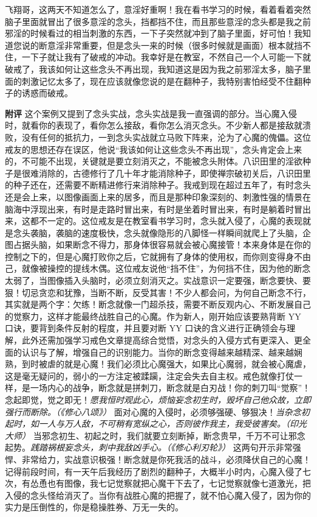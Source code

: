 \begin{case}
    飞翔哥，这两天不知道怎么了，意淫好重啊！我在看书学习的时候，看着看着突然脑子里面就冒出了很多意淫的念头，挡都挡不住，而且那些意淫的念头都是我之前邪淫的时候看过的相当刺激的东西，一下子突然就冲到了脑子里面，好可怕！我知道您说的断意淫非常重要，但是念头一来的时候（很多时候就是画面）根本就挡不住，一下子就让我有了破戒的冲动。我幸好是在教室，不然自己一个人可能一下就破戒了，我该如何让这些念头不再出现，我知道这是因为我之前邪淫太多，脑子里面的刺激记忆太多了，现在应该就像您说的是在翻种子，我特别害怕经受不住翻种子的诱惑而破戒。

    \textbf{附评} 这个案例又提到了念头实战，念头实战是我一直强调的部分。当心魔入侵时，就看你的表现了，看你怎么接敌，看你怎么消灭念头。不少新人都是接敌就溃败，没有任何的抵抗力，一到念头实战就立马败下阵来，沦为了心魔的傀儡。这位戒友的思想还存在误区，他说“我该如何让这些念头不再出现”，念头肯定会上来的，不可能不出现，关键就是要立刻消灭之，不能被念头附体。八识田里的淫欲种子是很难消除的，古德修行了几十年才能消除种子，即使禅宗破初关后，八识田里的种子还在，还需要不断精进修行来消除种子。我戒到现在超过五年了，有时念头还是会上来，以图像画面上来的居多，而且是那种印象深刻的、刺激性强的情景在脑海中浮现出来，有时是走路时冒出来，有时是坐着时冒出来，有时是躺着时冒出来，这都不一定的。这位戒友是在教室看书学习时，念头就入侵了，心魔的表现就是念头袭脑，袭脑的速度极快，念头就像隐形的八脚怪一样瞬间就爬上了头脑，企图占据头脑，如果断念不得力，那身体很容易就会被心魔接管！本来身体是在你的控制之下的，但是心魔打败你之后，它就拥有了身体的使用权，而你则变得身不由己，就像被操控的提线木偶。这位戒友说他“挡不住”，为何挡不住，因为他的断念太弱了，当图像插入头脑时，必须立刻消灭之。实战意识一定要强，断念要快、要狠！切忌贪恋和犹豫，当断不断，反受其害！不少人都会问，为何自己断念不行，其实就是两个字：欠练！断念就像一门超杀技，需要不断反观内心、不断发展自己的觉察力，这样才能最终战胜自己的心魔。作为新人，刚开始应该要熟背断 YY 口诀，要背到条件反射的程度，并且要对断 YY 口诀的含义进行正确领会与理解，此外还需加强学习戒色文章提高综合觉悟，对念头的入侵方式有更深入、更全面的认识与了解，增强自己的识别能力。当你的断念变得越来越精深、越来越娴熟，到时被虐的就是心魔！我们必须比心魔强大，如果比心魔弱，就会被心魔虐，这是毫无疑问的，弱小的一方注定被蹂躏，注定会失去自主权。戒色就像打仗一样，是一场内心的战争，断念就是拼刺刀，断念就是白刃战！你的刺刀叫“觉察”！念起即觉，觉之即无！\textit{愿我恒时观此心，烦恼妄念初生时，毁坏自己他众故，立即强行而断除。（《修心八颂》）} 面对心魔的入侵时，必须够强硬、够狠决！\textit{当杂念初起时，如一人与万人敌，不可稍有宽纵之心，否则彼作我主，我受彼害矣。（印光大师）} 当邪念初生、初起之时，我们就要立刻断掉，断念贵早，千万不可让邪念起势。\textit{践踏祸根妄念头，刺中我敌凶手心。（《修心利刃轮》）} 这两句开示非常强悍、非常给力，实战意识极强！断念就是你死我活的战斗，必须降伏自己的心魔！记得前段时间，有一天午后我经历了剧烈的翻种子，大概半小时内，心魔入侵了七次，有怂恿也有图像，我七记觉察就把心魔干下去了，七记觉察就像七道激光，把入侵的念头怪给消灭了。当你有战胜心魔的把握了，就不怕心魔入侵了，因为你的实力是压倒性的，你是稳操胜券、万无一失的。
\end{case}

